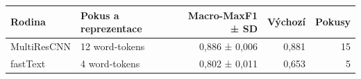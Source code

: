 \begin{tabular}{llrrr}
\toprule
Rodina & Pokus a reprezentace & Macro-MaxF1 ± SD & Výchozí & Pokusy\\
\midrule
MultiResCNN & 12 word-tokens & 0,886 ± 0,006 & 0,881 & 15\\
fastText & 4 word-tokens & 0,802 ± 0,011 & 0,653 & 5\\
\bottomrule
\end{tabular}

